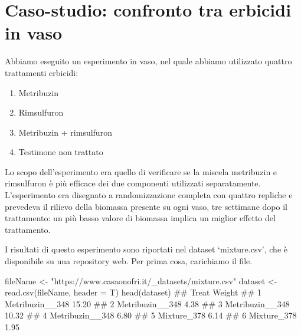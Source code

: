 \documentclass[a4paper,12pt,oneside]{book}
\providecommand{\tightlist}{%
  \setlength{\itemsep}{0pt}\setlength{\parskip}{0pt}}
\newenvironment{Shaded}{\begin{snugshade}}{\end{snugshade}}
\newcommand{\StringTok}[1]{#1}
\newcommand{\DocumentationTok}[1]{#1}
\newcommand{\OtherTok}[1]{#1}
\newcommand{\FunctionTok}[1]{#1}
\newcommand{\AttributeTok}[1]{#1}
\newcommand{\NormalTok}[1]{#1}
\begin{document}
\hypertarget{caso-studio-confronto-tra-erbicidi-in-vaso}{%
\section{Caso-studio: confronto tra erbicidi in vaso}\label{caso-studio-confronto-tra-erbicidi-in-vaso}}

Abbiamo eseguito un esperimento in vaso, nel quale abbiamo utilizzato quattro trattamenti erbicidi:

\begin{enumerate}
\def\labelenumi{\arabic{enumi}.}
\tightlist
\item
  Metribuzin
\item
  Rimsulfuron
\item
  Metribuzin + rimsulfuron
\item
  Testimone non trattato
\end{enumerate}

Lo scopo dell'esperimento era quello di verificare se la miscela metribuzin e rimsulfuron è più efficace dei due componenti utilizzati separatamente. L'esperimento era disegnato a randomizzazione completa con quattro repliche e prevedeva il rilievo della biomassa presente su ogni vaso, tre settimane dopo il trattamento: un più basso valore di biomassa implica un miglior effetto del trattamento.

I risultati di questo esperimento sono riportati nel dataset `mixture.csv', che è disponibile su una repository web. Per prima cosa, carichiamo il file.

\vspace{12pt}

\begin{Shaded}
\begin{Highlighting}[]
\NormalTok{fileName }\OtherTok{\textless{}{-}} \StringTok{"https://www.casaonofri.it/\_datasets/mixture.csv"}
\NormalTok{dataset }\OtherTok{\textless{}{-}} \FunctionTok{read.csv}\NormalTok{(fileName, }\AttributeTok{header =}\NormalTok{ T)}
\FunctionTok{head}\NormalTok{(dataset)}
\DocumentationTok{\#\#             Treat Weight}
\DocumentationTok{\#\# 1 Metribuzin\_\_348  15.20}
\DocumentationTok{\#\# 2 Metribuzin\_\_348   4.38}
\DocumentationTok{\#\# 3 Metribuzin\_\_348  10.32}
\DocumentationTok{\#\# 4 Metribuzin\_\_348   6.80}
\DocumentationTok{\#\# 5     Mixture\_378   6.14}
\DocumentationTok{\#\# 6     Mixture\_378   1.95}
\end{Highlighting}
\end{Shaded}
\end{document}
